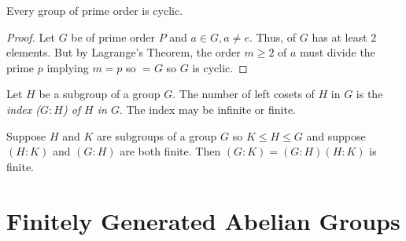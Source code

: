 \begin{corollary}
    Every group of prime order is cyclic.
\end{corollary}
\begin{proof}
    Let $G$ be of prime order $P$ and $a \in G, a \neq e$. Thus,  of $G$ has at least 2 elements. But by Lagrange's Theorem, the order $m \geq 2$ of $a$ must divide the prime $p$ implying $m = p$ so  $= G$ so $G$ is cyclic.
\end{proof}
\begin{definition}
    Let $H$ be a subgroup of a group $G$. The number of left cosets of $H$ in $G$ is the \emph{index ($G:H$) of $H$ in $G$}. The index may be infinite or finite.
\end{definition}
\begin{theorem}
    Suppose $H$ and $K$ are subgroups of a group $G$ so $K\leq H \leq G$ and suppose $(H:K)$ and $(G:H)$ are both finite. Then $(G:K) = (G:H)(H:K)$ is finite.
\end{theorem}

\section{Finitely Generated Abelian Groups}


